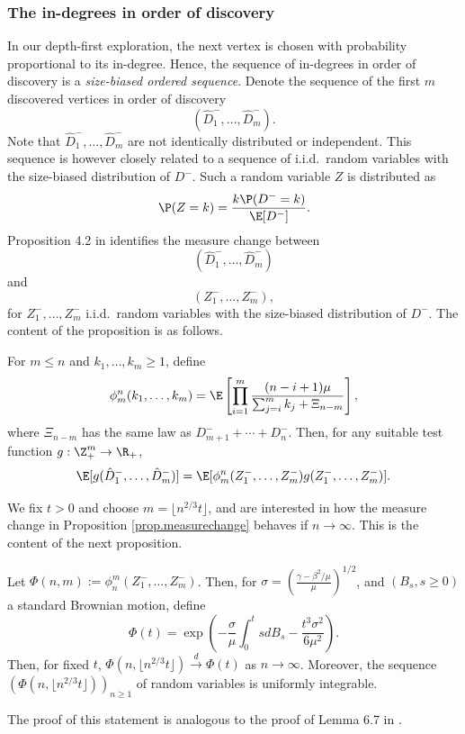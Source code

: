 \subsubsection{The in-degrees in order of discovery}
In our depth-first exploration, the next vertex is chosen with probability proportional to its in-degree. Hence, the sequence of in-degrees in order of discovery is a \emph{size-biased ordered sequence}. Denote the sequence of the first $m$ discovered vertices in order of discovery
$$(\hat{D}^-_1,\dots, \hat{D}^-_m).$$ Note that $\hat{D}_1^-,\dots , \hat{D}_m^-$ are not identically distributed or independent. This sequence is however closely related to a sequence of i.i.d.\ random variables with the size-biased distribution of $D^-$. Such a random variable $Z$ is distributed as $$\P(Z=k)=\frac{k\P(D^-=k)}{\E[D^-]}.$$
Proposition 4.2 in \cite{conchon--kerjanStableGraphMetric2020} identifies the measure change between $$(\hat{D}^-_1,\dots, \hat{D}^-_m)$$ and $$(Z_1^-,\dots,Z_m^-),$$ for $Z_1^-,\dots,Z_m^-$ i.i.d.\ random variables with the size-biased distribution of $D^-$. The content of the proposition is as follows.

\begin{proposition}\label{prop.measurechange}
For $m\leq n$ and $k_1,\dots,k_m\geq 1$, define
$$\phi_m^n(k_1,\dots,k_m)=\E\left[\prod\limits_{i=1}^m \frac{(n-i+1)\mu}{\sum_{j=i}^m k_j + \Xi_{n-m}}\right],$$
where $\Xi_{n-m}$ has the same law as $D^-_{m+1}+\cdots+D^-_n$. Then, for any suitable test function $g:\Z_+^m\to \R_+$, 
$$\E[g(\hat{D}^-_1,\dots, \hat{D}^-_m)]=\E[\phi_m^n(Z_1^-,\dots,Z_m^-)g(Z_1^-,\dots,Z_m^-)].$$
\end{proposition}

We fix $t>0$ and choose $m=\lfloor n^{2/3}t\rfloor$, and are interested in how the measure change in Proposition \ref{prop.measurechange} behaves if $n\to \infty$. This is the content of the next proposition. 
\begin{proposition}\label{prop.scalingmeasurechange}
Let $\Phi(n,m):=\phi_n^m(Z^-_1,\dots,Z^-_m)$. Then, for $\sigma=\left(\frac{\gamma-\beta^2/\mu}{\mu}\right)^{1/2}$, and $(B_s,s\geq 0)$ a standard Brownian motion, define $$\Phi(t)=\exp\left(-\frac{\sigma}{\mu}\int_0^tsdB_s - \frac{t^3 \sigma^2}{6\mu^2}\right).$$
Then, for fixed $t$, $\Phi(n,\lfloor  n^{2/3} t \rfloor)\overset{d}{\to}\Phi(t)$ as $n\to \infty$. Moreover, the sequence $(\Phi(n,\lfloor  n^{2/3} t \rfloor))_{n\geq1}$ of random variables is uniformly integrable. 
\end{proposition}
The proof of this statement is analogous to the proof of Lemma 6.7 in \cite{conchon--kerjanStableGraphMetric2020}.\\

